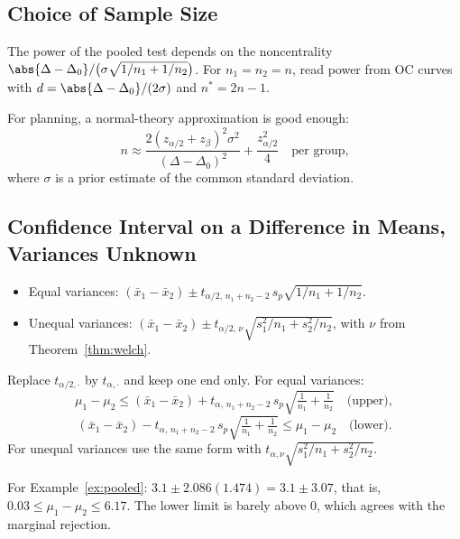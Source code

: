 \subsection{Choice of Sample Size}

The power of the pooled test depends on the noncentrality $\abs{\Delta-\Delta_0}/\big(\sigma\sqrt{1/n_1+1/n_2}\big)$. For $n_1=n_2=n$, read power from OC curves with $d=\abs{\Delta-\Delta_0}/(2\sigma)$ and $n^*=2n-1$.

For planning, a normal-theory approximation is good enough:
\[ n\approx\frac{2(z_{\alpha/2}+z_\beta)^2\sigma^2}{(\Delta-\Delta_0)^2}+\frac{z_{\alpha/2}^2}4\quad\text{per group,} \]
where $\sigma$ is a prior estimate of the common standard deviation.

\subsection{Confidence Interval on a Difference in Means, Variances Unknown}

\begin{theorem}\label{thm:twot-ci}
\begin{itemize}
  \item Equal variances: $(\bar{x}_1-\bar{x}_2)\pm t_{\alpha/2,\,n_1+n_2-2}\,s_p\sqrt{1/n_1+1/n_2}$.
  \item Unequal variances: $(\bar{x}_1-\bar{x}_2)\pm t_{\alpha/2,\,\nu}\sqrt{s_1^2/n_1+s_2^2/n_2}$, with $\nu$ from Theorem~\ref{thm:welch}.
\end{itemize}
\end{theorem}

\begin{theorem}
Replace $t_{\alpha/2,\cdot}$ by $t_{\alpha,\cdot}$ and keep one end only. For equal variances:
\[ \mu_1-\mu_2\le(\bar{x}_1-\bar{x}_2)+t_{\alpha,\,n_1+n_2-2}\,s_p\sqrt{\tfrac1{n_1}+\tfrac1{n_2}}\quad\text{(upper)}, \]
\[ (\bar{x}_1-\bar{x}_2)-t_{\alpha,\,n_1+n_2-2}\,s_p\sqrt{\tfrac1{n_1}+\tfrac1{n_2}}\le\mu_1-\mu_2\quad\text{(lower)}. \]
For unequal variances use the same form with $t_{\alpha,\nu}\sqrt{s_1^2/n_1+s_2^2/n_2}$.
\end{theorem}

\begin{example}
For Example~\ref{ex:pooled}: $3.1\pm2.086(1.474)=3.1\pm3.07$, that is, $0.03\le\mu_1-\mu_2\le6.17$. The lower limit is barely above $0$, which agrees with the marginal rejection.
\end{example}

